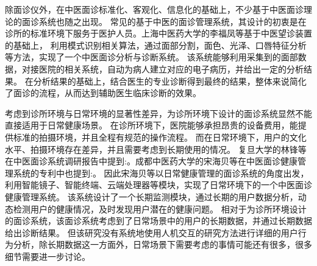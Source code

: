 除面诊仪外，在中医面诊标准化、客观化、信息化的基础上，不少基于中医面诊理论的面诊系统也随之出现。
常见的基于中医的面诊管理系统，其设计的初衷是在诊所的标准环境下服务于医护人员。上海中医药大学的李福凤等基于中医望诊装置\cite{李国正0一种用于中医望诊的三维图像采集装置}的基础上，
利用模式识别相关算法，通过面部分割，面色、光泽、口唇特征分析等方法，实现了一个中医面诊分析与诊断系统\cite{李福凤2016中医面诊分析与诊断系统}。
该系统能够利用采集到的面部数据，对接医院的相关系统，自动为病人建立对应的电子病历，并给出一定的分析结果。
在分析结果的基础上，结合医生的专业诊断得到最终的结果，整体来说简化了面诊的流程，从而达到辅助医生临床诊断的效果。

考虑到诊所环境与日常环境的显著性差异，为诊所环境下设计的面诊系统显然不能直接适用于日常健康场景。
在诊所环境下，医院能够承担昂贵的设备费用，能提供标准的拍摄环境，并且全程有规范的操作流程。
而在日常环境下，用户的文化水平、拍摄环境存在差异，并且需要考虑到长期使用的情况。
复旦大学的林锋等在中医面诊系统调研报告\cite{林锋2019中医面诊系统调研报告}中提到:。成都中医药大学的宋海贝等在中医面诊健康管理系统的专利\cite{宋海贝2019中医面诊健康管理系统}中也提到:。
因此宋海贝等以日常健康管理的面诊系统的角度出发，利用智能镜子、智能终端、云端处理器等模块，实现了日常环境下的一个中医面诊健康管理系统。
该系统设计了一个长期监测模块，通过长期的用户数据分析，动态检测用户的健康情况，及时发现用户潜在的健康问题。
相对于为诊所环境设计的面诊系统，该面诊系统考虑到了日常场景中的用户的长期数据，并通过长期数据给出诊断结果。
但该研究没有系统地使用人机交互的研究方法进行详细的用户行为分析，除长期数据这一方面外，日常场景下需要考虑的事情可能还有很多，很多细节需要进一步讨论。

